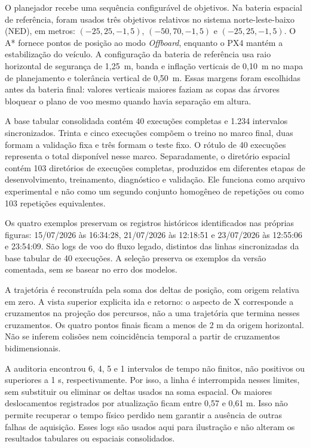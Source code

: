 O planejador recebe uma sequência configurável de objetivos. Na bateria espacial de referência, foram usados três objetivos relativos no sistema norte-leste-baixo (NED), em metros: $(-25,25,-1{,}5)$, $(-50,70,-1{,}5)$ e $(-25,25,-1{,}5)$. O A* fornece pontos de posição ao modo \textit{Offboard}, enquanto o PX4 mantém a estabilização do veículo. A configuração da bateria de referência usa raio horizontal de segurança de 1,25~m, banda e inflação verticais de 0,10~m no mapa de planejamento e tolerância vertical de 0,50~m. Essas margens foram escolhidas antes da bateria final: valores verticais maiores faziam as copas das árvores bloquear o plano de voo mesmo quando havia separação em altura.

A base tabular consolidada contém 40 execuções completas e 1.234 intervalos sincronizados. Trinta e cinco execuções compõem o treino no marco final, duas formam a validação fixa e três formam o teste fixo. O rótulo de 40 execuções representa o total disponível nesse marco. Separadamente, o diretório espacial contém 103 diretórios de execuções completas, produzidos em diferentes etapas de desenvolvimento, treinamento, diagnóstico e validação. Ele funciona como arquivo experimental e não como um segundo conjunto homogêneo de repetições ou como 103 repetições equivalentes.

Os quatro exemplos preservam os registros históricos identificados nas próprias figuras: 15/07/2026 às 16:34:28, 21/07/2026 às 12:18:51 e 23/07/2026 às 12:55:06 e 23:54:09. São logs de voo do fluxo legado, distintos das linhas sincronizadas da base tabular de 40 execuções. A seleção preserva os exemplos da versão comentada, sem se basear no erro dos modelos.

A trajetória é reconstruída pela soma dos deltas de posição, com origem relativa em zero. A vista superior explicita ida e retorno: o aspecto de X corresponde a cruzamentos na projeção dos percursos, não a uma trajetória que termina nesses cruzamentos. Os quatro pontos finais ficam a menos de 2 m da origem horizontal. Não se inferem colisões nem coincidência temporal a partir de cruzamentos bidimensionais.

A auditoria encontrou 6, 4, 5 e 1 intervalos de tempo não finitos, não positivos ou superiores a 1 s, respectivamente. Por isso, a linha é interrompida nesses limites, sem substituir ou eliminar os deltas usados na soma espacial. Os maiores deslocamentos registrados por atualização ficam entre 0,57 e 0,61 m. Isso não permite recuperar o tempo físico perdido nem garantir a ausência de outras falhas de aquisição. Esses logs são usados aqui para ilustração e não alteram os resultados tabulares ou espaciais consolidados.

